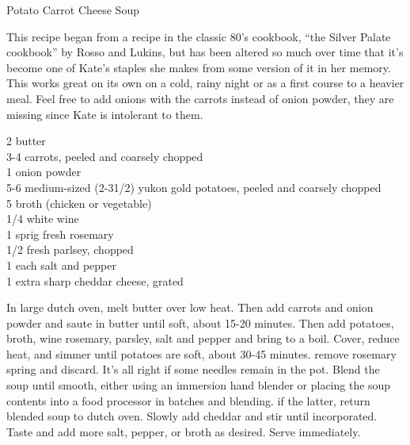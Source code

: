 \begin{entry}{Potato Carrot Cheese Soup}

\begin{open}
  This recipe began from a recipe in the classic 80's cookbook, ``the Silver
  Palate cookbook'' by Rosso and Lukins, but has been altered so much over
  time that it's become one of Kate's staples she makes from some version of
  it in her memory. This works great on its own on a cold, rainy night or as a
  first course to a heavier meal. Feel free to add onions with the carrots
  instead of onion powder, they are missing since Kate is intolerant to them.
\end{open}
\begin{ingredients}
    \SI{2}{\tblspoon} butter\\
    3-4 carrots, peeled and coarsely chopped\\
    \SI{1}{\teaspoon} onion powder\\
    5-6 medium-sized (2-3\SI{1/2}{\pound}) yukon gold potatoes, peeled and
    coarsely chopped \\
    \SI{5}{\cup} broth (chicken or vegetable)\\
    \SI{1/4}{\cup} white wine \\
    1 sprig fresh rosemary \\
    \SI{1/2}{\cup} fresh parlsey, chopped\\
    \SI{1}{\teaspoon} each salt and pepper\\
    \SI{1}{\cup} extra sharp cheddar cheese, grated
\end{ingredients}
In large dutch oven, melt butter over low heat. Then add carrots and onion
powder and saute in butter until soft, about 15-20 minutes. Then add potatoes,
broth, wine rosemary, parsley, salt and pepper and bring to a boil. Cover,
reduce heat, and simmer until potatoes are soft, about 30-45 minutes. remove
rosemary spring and discard. It's all right if some needles remain in the
pot. Blend the soup until smooth, either using an immersion hand blender or
placing the soup contents into a food processor in batches and blending. if
the latter, return blended soup to dutch oven. Slowly add cheddar and stir
until incorporated. Taste and add more salt, pepper, or broth as
desired. Serve immediately.
\end{entry}